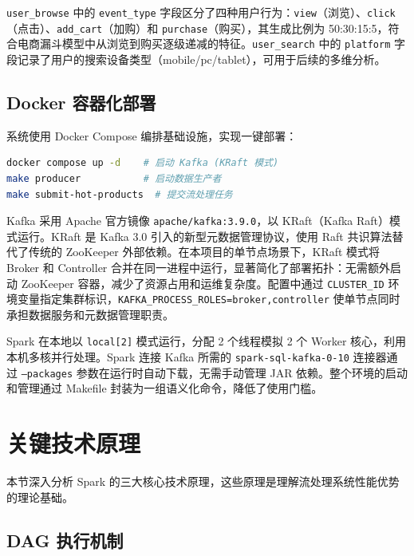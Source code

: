 \documentclass[12pt,a4paper]{article}
\begin{document}
\texttt{user\_browse} 中的 \texttt{event\_type} 字段区分了四种用户行为：\texttt{view}（浏览）、\texttt{click}（点击）、\texttt{add\_cart}（加购）和 \texttt{purchase}（购买），其生成比例为 50:30:15:5，符合电商漏斗模型中从浏览到购买逐级递减的特征。\texttt{user\_search} 中的 \texttt{platform} 字段记录了用户的搜索设备类型（mobile/pc/tablet），可用于后续的多维分析。

\subsection{Docker 容器化部署}

系统使用 Docker Compose 编排基础设施，实现一键部署：

\begin{lstlisting}[language=bash, caption={环境启动命令}]
docker compose up -d    # 启动 Kafka (KRaft 模式)
make producer           # 启动数据生产者
make submit-hot-products  # 提交流处理任务
\end{lstlisting}

Kafka 采用 Apache 官方镜像 \texttt{apache/kafka:3.9.0}，以 KRaft（Kafka Raft）模式运行。KRaft 是 Kafka 3.0 引入的新型元数据管理协议，使用 Raft 共识算法替代了传统的 ZooKeeper 外部依赖\cite{kreps2011}。在本项目的单节点场景下，KRaft 模式将 Broker 和 Controller 合并在同一进程中运行，显著简化了部署拓扑：无需额外启动 ZooKeeper 容器，减少了资源占用和运维复杂度。配置中通过 \texttt{CLUSTER\_ID} 环境变量指定集群标识，\texttt{KAFKA\_PROCESS\_ROLES=broker,controller} 使单节点同时承担数据服务和元数据管理职责。

Spark 在本地以 \texttt{local[2]} 模式运行，分配 2 个线程模拟 2 个 Worker 核心，利用本机多核并行处理。Spark 连接 Kafka 所需的 \texttt{spark-sql-kafka-0-10} 连接器通过 \texttt{--packages} 参数在运行时自动下载，无需手动管理 JAR 依赖。整个环境的启动和管理通过 Makefile 封装为一组语义化命令，降低了使用门槛。

\section{关键技术原理}

本节深入分析 Spark 的三大核心技术原理，这些原理是理解流处理系统性能优势的理论基础。

\subsection{DAG 执行机制}
\end{document}
